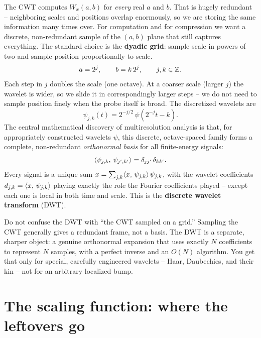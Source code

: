 The CWT computes $W_x(a,b)$ for \emph{every} real $a$ and $b$. That is hugely
redundant -- neighboring scales and positions overlap enormously, so we are
storing the same information many times over. For computation and for compression
we want a discrete, non-redundant sample of the $(a,b)$ plane that still captures
everything. The standard choice is the \textbf{dyadic grid}: sample scale in
powers of two and sample position proportionally to scale.
\begin{equation}
\label{ch24:dyadic-grid}
a = 2^{j}, \qquad b = k\,2^{j}, \qquad j,k \in \mathbb{Z}.
\end{equation}
Each step in $j$ doubles the scale (one octave). At a coarser scale (larger $j$)
the wavelet is wider, so we slide it in correspondingly larger steps -- we do not
need to sample position finely when the probe itself is broad. The discretized
wavelets are
\begin{equation}
\label{ch24:dwt-basis}
\psi_{j,k}(t) = 2^{-j/2}\,\psi\!\left(2^{-j}t - k\right).
\end{equation}
The central mathematical discovery of multiresolution analysis is that,
for appropriately constructed wavelets $\psi$, this discrete, octave-spaced family forms
a complete, non-redundant \emph{orthonormal basis} for all finite-energy signals:
\begin{equation}
\label{ch24:orthonormal}
\langle \psi_{j,k},\, \psi_{j',k'} \rangle = \delta_{jj'}\,\delta_{kk'}.
\end{equation}
Every signal is a unique sum $x = \sum_{j,k} \langle x,\, \psi_{j,k} \rangle\,\psi_{j,k}$,
with the wavelet coefficients $d_{j,k} = \langle x,\, \psi_{j,k} \rangle$ playing exactly
the role the Fourier coefficients played -- except each one is local in both time
and scale. This is the \textbf{discrete wavelet transform} (DWT).

\begin{trapbox}
Do not confuse the DWT with ``the CWT sampled on a grid.'' Sampling the CWT
generally gives a redundant frame, not a basis. The DWT is a separate, sharper
object: a genuine orthonormal expansion that uses exactly $N$ coefficients to
represent $N$ samples, with a perfect inverse and an $O(N)$ algorithm. You get
that only for special, carefully engineered wavelets -- Haar, Daubechies, and
their kin -- not for an arbitrary localized bump.
\end{trapbox}

\section{The scaling function: where the leftovers go}
\label{ch24:scaling}

